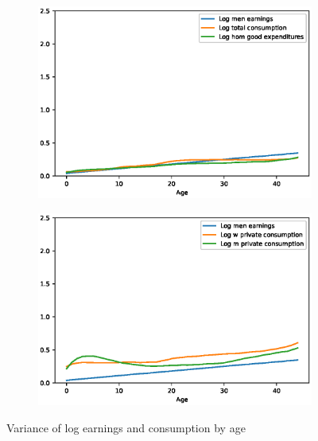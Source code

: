 \documentclass[]{article}
\begin{document}
\begin{figure}[H]
	\centering
	\begin{subfigure}{0.49\textwidth} %
		\centering
		\includegraphics[width=\textwidth]{lifecycle_ineq1.eps} %
		\label{fig:picture1}
	\end{subfigure}
	\begin{subfigure}{0.49\textwidth}
		\centering
		\includegraphics[width=\textwidth]{lifecycle_ineq2.eps} %
		\label{fig:picture2}
	\end{subfigure}

	\caption{Variance of log earnings and consumption by age}
	\label{fig:all_pictures}
\end{figure}
\end{document}
